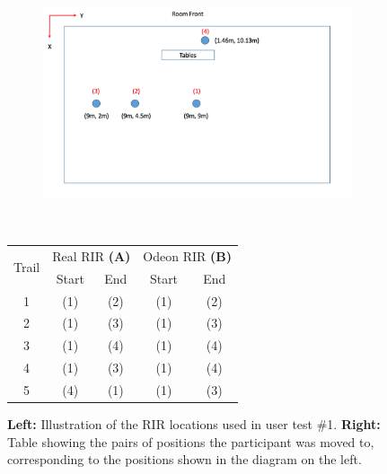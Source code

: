 \documentclass[../../main.tex]{subfiles}
\begin{document}
			\begin{figure}[H]
				\begin{minipage}{0.5\textwidth}
					\begin{figure}[H]
						\centerline{\includegraphics[scale = 0.5]{Sections/userTesting/images/test1/roomPositions3.png}}
					\end{figure}			
				\end{minipage}
				~
				\hspace{25mm}\begin{minipage}{0.5\textwidth}
				\begin{table}[H]
				    \begin{tabular}{|c|cc|cc|} \hline
				        \multirow{2}{*}{Trail} & \multicolumn{2}{c|}{Real RIR \textbf{(A)}} & \multicolumn{2}{c|}{Odeon RIR \textbf{(B)}}\\ \cline{2-5}
				            & Start & End & Start & End \\ \hline
				          1 & (1) & (2) & (1) & (2)\\
				          2 & (1) & (3) & (1) & (3)\\
				          3 & (1) & (4) & (1) & (4)\\ \hline
				          4 & (1) & (3) & (1) & (4)\\ 
				          5 & (4) & (1) & (1) & (3)\\ \hline
				    \end{tabular}
				\end{table}
				\end{minipage}
				\caption{\textbf{Left:} Illustration of the \ac{RIR} locations used in user test \#1. \textbf{Right:} Table showing the pairs of positions the participant was moved to, corresponding to the positions shown in the diagram on the left.}
				\label{test1}
			\end{figure}
\end{document}
